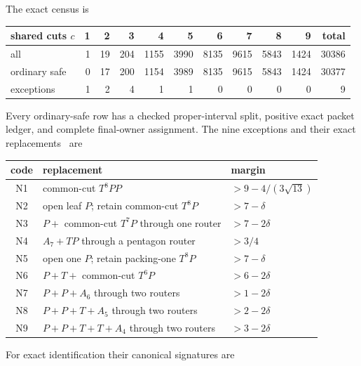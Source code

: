 \documentclass[11pt]{article}
\begin{document}
The exact census is
\begin{center}
\begin{tabular}{lrrrrrrrrr|r}
\toprule
shared cuts $c$&1&2&3&4&5&6&7&8&9&total\\
\midrule
all&1&19&204&1155&3990&8135&9615&5843&1424&30386\\
ordinary safe&0&17&200&1154&3989&8135&9615&5843&1424&30377\\
exceptions&1&2&4&1&1&0&0&0&0&9\\
\bottomrule
\end{tabular}
\end{center}
Every ordinary-safe row has a checked proper-interval split, positive exact
packet ledger, and complete final-owner assignment.  The nine exceptions and
their exact replacements~\cite{Nine,NineCode} are
\begin{center}
\small
\begin{tabular}{cll}
\toprule
code&replacement&margin\\
\midrule
N1&common-cut $T^8PP$&$>9-4/(3\sqrt{13})$\\
N2&open leaf $P$; retain common-cut $T^8P$&$>7-\delta$\\
N3&$P+$ common-cut $T^7P$ through one router&$>7-2\delta$\\
N4&$A_7+TP$ through a pentagon router&$>3/4$\\
N5&open one $P$; retain packing-one $T^8P$&$>7-\delta$\\
N6&$P+T+$ common-cut $T^6P$&$>6-2\delta$\\
N7&$P+P+A_6$ through two routers&$>1-2\delta$\\
N8&$P+P+T+A_5$ through two routers&$>2-2\delta$\\
N9&$P+P+T+T+A_4$ through two routers&$>3-2\delta$\\
\bottomrule
\end{tabular}
\end{center}
For exact identification their canonical signatures are
\begin{description}
\small
\item[N1] 
\item[N2] 
\item[N3] 
\item[N4] 
\item[N5] 
\item[N6] 
\item[N7] 
\item[N8] 
\item[N9] 
\end{description}
\end{document}
